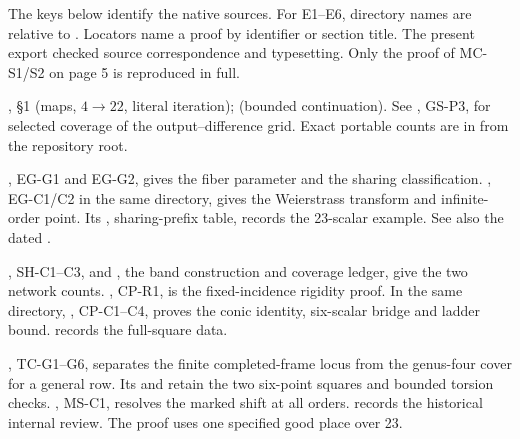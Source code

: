 \raggedright
{}
The keys below identify the native sources. For E1--E6, directory names are relative to . Locators name a proof by identifier or section title. The present export checked source correspondence and typesetting. Only the proof of MC-S1/S2 on page 5 is reproduced in full.

, \S1 (maps, $4\to22$, literal iteration);  (bounded continuation). See , GS-P3, for selected coverage of the output--difference grid. Exact portable counts are in  from the repository root.

, EG-G1 and EG-G2, gives the fiber parameter and the sharing classification. , EG-C1/C2 in the same directory, gives the Weierstrass transform and infinite-order point. Its , sharing-prefix table, records the 23-scalar example. See also the dated . \cite{elliptic}

, SH-C1--C3, and , the band construction and coverage ledger, give the two network counts. , CP-R1, is the fixed-incidence rigidity proof. In the same directory, , CP-C1--C4, proves the conic identity, six-scalar bridge and ladder bound.  records the full-square data.

, TC-G1--G6, separates the finite completed-frame locus from the genus-four cover for a general row. Its  and  retain the two six-point squares and bounded torsion checks. , MS-C1, resolves the marked shift at all orders.  records the historical internal review. The proof uses one specified good place over 23. \cite{frames}

